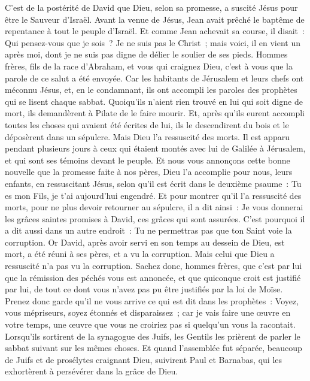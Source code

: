 \begin{multicols}{2}
C'est de la postérité de David que Dieu, selon sa promesse, a suscité Jésus pour être le Sauveur d'Israël.
Avant la venue de Jésus, Jean avait prêché le baptême de repentance à tout le peuple d'Israël.
Et comme Jean achevait sa course, il disait~: Qui pensez-vous que je sois~? Je ne suis pas le Christ~; mais voici, il en vient un après moi, dont je ne suis pas digne de délier le soulier de ses pieds.
Hommes frères, fils de la race d'Abraham, et vous qui craignez Dieu, c'est à vous que la parole de ce salut a été envoyée.
Car les habitants de Jérusalem et leurs chefs ont méconnu Jésus, et, en le condamnant, ils ont accompli les paroles des prophètes qui se lisent chaque sabbat.
Quoiqu'ils n'aient rien trouvé en lui qui soit digne de mort, ils demandèrent à Pilate de le faire mourir.
Et, après qu'ils eurent accompli toutes les choses qui avaient été écrites de lui, ils le descendirent du bois et le déposèrent dans un sépulcre.
Mais Dieu l'a ressuscité des morts.
Il est apparu pendant plusieurs jours à ceux qui étaient montés avec lui de Galilée à Jérusalem, et qui sont ses témoins devant le peuple.
Et nous vous annonçons cette bonne nouvelle que la promesse faite à nos pères,
Dieu l'a accomplie pour nous, leurs enfants, en ressuscitant Jésus, selon qu'il est écrit dans le deuxième psaume~: Tu es mon Fils, je t'ai aujourd'hui engendré.
Et pour montrer qu'il l'a ressuscité des morts, pour ne plus devoir retourner au sépulcre, il a dit ainsi~: Je vous donnerai les grâces saintes promises à David, ces grâces qui sont assurées.
C'est pourquoi il a dit aussi dans un autre endroit~: Tu ne permettras pas que ton Saint voie la corruption.
Or David, après avoir servi en son temps au dessein de Dieu, est mort, a été réuni à ses pères, et a vu la corruption.
Mais celui que Dieu a ressuscité n'a pas vu la corruption.
Sachez donc, hommes frères, que c'est par lui que la rémission des péchés vous est annoncée,
et que quiconque croit est justifié par lui, de tout ce dont vous n'avez pas pu être justifiés par la loi de Moïse.
Prenez donc garde qu'il ne vous arrive ce qui est dit dans les prophètes~:
Voyez, vous mépriseurs, soyez étonnés et disparaissez~; car je vais faire une œuvre en votre temps, une œuvre que vous ne croiriez pas si quelqu'un vous la racontait.
Lorsqu'ils sortirent de la synagogue des Juifs, les Gentils les prièrent de parler le sabbat suivant sur les mêmes choses.
Et quand l'assemblée fut séparée, beaucoup de Juifs et de prosélytes craignant Dieu, suivirent Paul et Barnabas, qui les exhortèrent à persévérer dans la grâce de Dieu.

\end{multicols}
